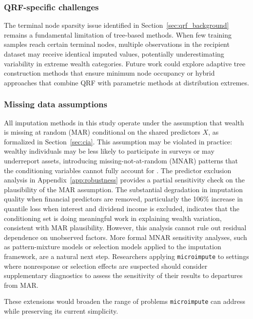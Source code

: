 \subsubsection{QRF-specific challenges}

The terminal node sparsity issue identified in Section~\ref{sec:qrf_background} remains a fundamental limitation of tree-based methods. When few training samples reach certain terminal nodes, multiple observations in the recipient dataset may receive identical imputed values, potentially underestimating variability in extreme wealth categories. Future work could explore adaptive tree construction methods that ensure minimum node occupancy or hybrid approaches that combine QRF with parametric methods at distribution extremes.

\subsubsection{Missing data assumptions}

All imputation methods in this study operate under the assumption that wealth is missing at random (MAR) conditional on the shared predictors $X$, as formalized in Section~\ref{sec:cia}. This assumption may be violated in practice: wealthy individuals may be less likely to participate in surveys or may underreport assets, introducing missing-not-at-random (MNAR) patterns that the conditioning variables cannot fully account for \citep{andridge2010review}. The predictor exclusion analysis in Appendix~\ref{app:robustness} provides a partial sensitivity check on the plausibility of the MAR assumption. The substantial degradation in imputation quality when financial predictors are removed, particularly the 106\% increase in quantile loss when interest and dividend income is excluded, indicates that the conditioning set is doing meaningful work in explaining wealth variation, consistent with MAR plausibility. However, this analysis cannot rule out residual dependence on unobserved factors. More formal MNAR sensitivity analyses, such as pattern-mixture models or selection models applied to the imputation framework, are a natural next step. Researchers applying \texttt{microimpute} to settings where nonresponse or selection effects are suspected should consider supplementary diagnostics to assess the sensitivity of their results to departures from MAR.

These extensions would broaden the range of problems \texttt{microimpute} can address while preserving its current simplicity.
